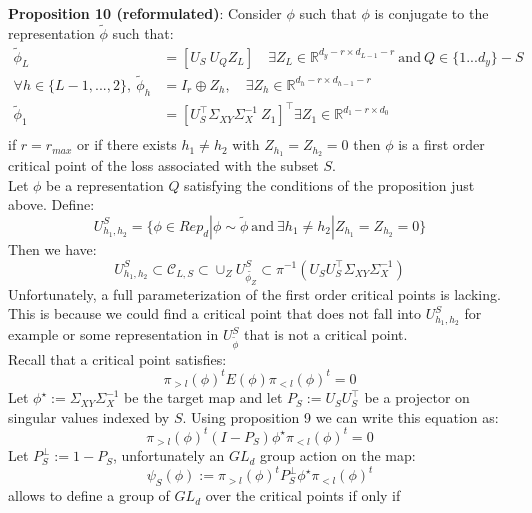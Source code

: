 \documentclass{article}
\theoremstyle{definition}
\begin{document}
\textbf{Proposition 10 (reformulated)}: Consider $\phi$ such that $\phi$ is conjugate to the representation $\tilde{\phi}$ such that:
\begin{align*}
\tilde{\phi}_L & = [U_S \ U_QZ_L ] \quad \exists Z_L\in\mathbb{R}^{d_y-r \times d_{L-1} - r} \ \text{and} \ Q\in\{1...d_y\} - S\\
    \forall h\in\{L-1,...,2\}, \ \tilde{\phi}_h & = I_r \oplus Z_h,  \quad \exists Z_h\in\mathbb{R}^{d_h-r \times d_{h-1} - r}\\
    \tilde{\phi}_1 & = [U_S^{\top}\Sigma_{XY}\Sigma_{X}^{-1} \ Z_1]^{\top} \exists Z_1\in\mathbb{R}^{d_1-r \times d_{0}}\\
\end{align*}
if $r=r_{max}$ or if there exists $h_1\neq h_2$ with $Z_{h_1} = Z_{h_2} = 0$ then $\phi$ is a first order critical point of the loss associated with the subset $S$.
\\
Let $\phi$ be a representation $Q$ satisfying the conditions of the proposition just above. Define:
\begin{equation*}
    U^S_{h_1,h_2} = \{\phi\in Rep_d|\phi \sim \tilde{\phi} \ \text{and} \ \exists h_1\neq h_2|Z_{h_1} = Z_{h_2} = 0 \}
\end{equation*}
Then we have:
$$U^S_{h_1,h_2} \subset \mathcal{C}_{L,S} \subset \cup_Z U_{\tilde{\phi_Z}}^S \subset \pi^{-1}(U_SU_S^{\top}\Sigma_{XY}\Sigma_{X}^{-1}) $$
Unfortunately, a full parameterization of the first order critical points is lacking. This is because we could find a critical point that does not fall into $U^S_{h_1,h_2}$ for example or some representation in $U_{\tilde{\phi}}^S$ that is not a critical point.
\\
Recall that a critical point satisfies:
\begin{equation*}
    \pi_{>l}(\phi)^{t}E(\phi)\pi_{<l}(\phi)^{t} = 0
\end{equation*}
Let $\phi^{\star} := \Sigma_{XY}\Sigma_{X}^{-1} $ be the target map and let $P_S:=U_SU_S^{\top}$ be a projector on singular values indexed by $S$. Using proposition 9 we can write this equation as:
\begin{equation*}
    \pi_{>l}(\phi)^{t}(I - P_S)\phi^{\star}\pi_{<l}(\phi)^{t} = 0
\end{equation*}
Let $P_S^{\perp}:= 1 - P_S$, unfortunately an $GL_d$ group action on the map:
\begin{equation*}
    \psi_S(\phi):= \pi_{>l}(\phi)^{t}P_S^{\perp}\phi^{\star}\pi_{<l}(\phi)^{t}
\end{equation*}
allows to define a group of $GL_d$ over the critical points if only if 
\end{document}
